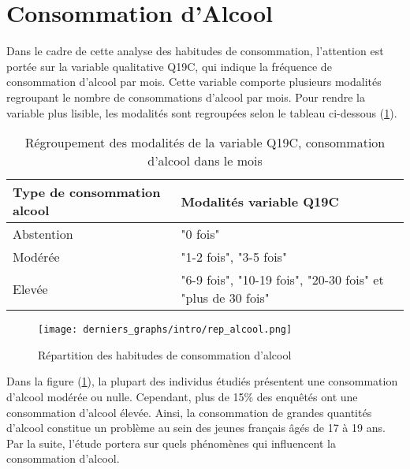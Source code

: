 \documentclass{article}
\begin{document}
\section{Consommation d'Alcool}
Dans le cadre de cette analyse des habitudes de consommation, l'attention est portée sur la variable qualitative Q19C, qui indique la fréquence de consommation d'alcool par mois. Cette variable comporte plusieurs modalités regroupant le nombre de consommations d'alcool par mois. Pour rendre la variable plus lisible, les modalités sont regroupées selon le tableau ci-dessous (\ref{tab:reg-al}).
\begin{table}[H]
    \centering
    \begin{tabular}{l|l}
        \toprule
        \textbf{Type de consommation alcool} & \textbf{Modalités variable Q19C} \\
        \midrule
        Abstention & "0 fois" \\
        Modérée & "1-2 fois", "3-5 fois" \\
        Elevée & "6-9 fois", "10-19 fois", "20-30 fois" et "plus de 30
fois" \\

        \bottomrule
    \end{tabular}
    \caption{Régroupement des modalités de la variable Q19C, consommation d'alcool dans le mois}
    \label{tab:reg-al}

\end{table}

\begin{figure}[H]
\centering
  
    \texttt{[image: derniers\_graphs/intro/rep\_alcool.png]}
    
  \caption{Répartition des habitudes de consommation d'alcool}
  \label{fig:ecofig1}
    
\end{figure}

Dans la figure (\ref{fig:ecofig1}), la plupart des individus étudiés présentent une consommation d'alcool modérée ou nulle. Cependant, plus de 15\% des enquêtés ont une consommation d'alcool élevée. Ainsi, la consommation de grandes quantités d'alcool constitue un problème au sein des jeunes français âgés de 17 à 19 ans. Par la suite, l'étude portera sur quels phénomènes qui influencent la consommation d'alcool. 
\end{document}
